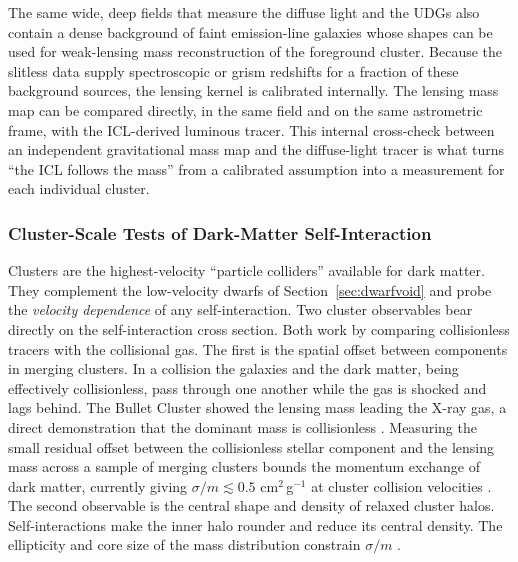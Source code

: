 The same wide, deep fields that measure the diffuse light and the UDGs also contain a dense background of faint emission-line galaxies whose shapes can be used for weak-lensing mass reconstruction of the foreground cluster. Because the slitless data supply spectroscopic or grism redshifts for a fraction of these background sources, the lensing kernel is calibrated internally. The lensing mass map can be compared directly, in the same field and on the same astrometric frame, with the ICL-derived luminous tracer. This internal cross-check between an independent gravitational mass map and the diffuse-light tracer is what turns ``the ICL follows the mass'' from a calibrated assumption into a measurement for each individual cluster.

\subsubsection{Cluster-Scale Tests of Dark-Matter Self-Interaction}

Clusters are the highest-velocity ``particle colliders'' available for dark matter. They complement the low-velocity dwarfs of Section~\ref{sec:dwarfvoid} and probe the \emph{velocity dependence} of any self-interaction. Two cluster observables bear directly on the self-interaction cross section. Both work by comparing collisionless tracers with the collisional gas. The first is the spatial offset between components in merging clusters. In a collision the galaxies and the dark matter, being effectively collisionless, pass through one another while the gas is shocked and lags behind. The Bullet Cluster showed the lensing mass leading the X-ray gas, a direct demonstration that the dominant mass is collisionless \cite{clowe2006}. Measuring the small residual offset between the collisionless stellar component and the lensing mass across a sample of merging clusters bounds the momentum exchange of dark matter, currently giving $\sigma/m\lesssim0.5$ cm$^2$\,g$^{-1}$ at cluster collision velocities \cite{harvey2015}. The second observable is the central shape and density of relaxed cluster halos. Self-interactions make the inner halo rounder and reduce its central density. The ellipticity and core size of the mass distribution constrain $\sigma/m$ \cite{peter2013}.

